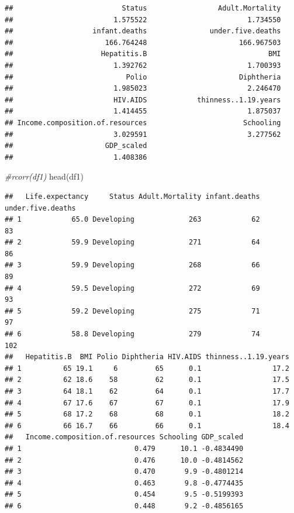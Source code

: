 \documentclass[
]{article}
\newenvironment{Shaded}{\begin{snugshade}}{\end{snugshade}}
\newcommand{\CommentTok}[1]{\textcolor[rgb]{0.56,0.35,0.01}{\textit{#1}}}
\newcommand{\FunctionTok}[1]{\textcolor[rgb]{0.00,0.00,0.00}{#1}}
\newcommand{\NormalTok}[1]{#1}
\begin{document}
\begin{verbatim}
##                          Status                 Adult.Mortality 
##                        1.575522                        1.734550 
##                   infant.deaths               under.five.deaths 
##                      166.764248                      166.967503 
##                     Hepatitis.B                             BMI 
##                        1.392762                        1.700393 
##                           Polio                      Diphtheria 
##                        1.985023                        2.246470 
##                        HIV.AIDS            thinness..1.19.years 
##                        1.414455                        1.875037 
## Income.composition.of.resources                       Schooling 
##                        3.029591                        3.277562 
##                      GDP_scaled 
##                        1.408386
\end{verbatim}

\begin{Shaded}
\begin{Highlighting}[]
\CommentTok{\#rcorr(df1)}
\FunctionTok{head}\NormalTok{(df1)}
\end{Highlighting}
\end{Shaded}

\begin{verbatim}
##   Life.expectancy     Status Adult.Mortality infant.deaths under.five.deaths
## 1            65.0 Developing             263            62                83
## 2            59.9 Developing             271            64                86
## 3            59.9 Developing             268            66                89
## 4            59.5 Developing             272            69                93
## 5            59.2 Developing             275            71                97
## 6            58.8 Developing             279            74               102
##   Hepatitis.B  BMI Polio Diphtheria HIV.AIDS thinness..1.19.years
## 1          65 19.1     6         65      0.1                 17.2
## 2          62 18.6    58         62      0.1                 17.5
## 3          64 18.1    62         64      0.1                 17.7
## 4          67 17.6    67         67      0.1                 17.9
## 5          68 17.2    68         68      0.1                 18.2
## 6          66 16.7    66         66      0.1                 18.4
##   Income.composition.of.resources Schooling GDP_scaled
## 1                           0.479      10.1 -0.4834490
## 2                           0.476      10.0 -0.4814562
## 3                           0.470       9.9 -0.4801214
## 4                           0.463       9.8 -0.4774435
## 5                           0.454       9.5 -0.5199393
## 6                           0.448       9.2 -0.4856165
\end{verbatim}
\end{document}
